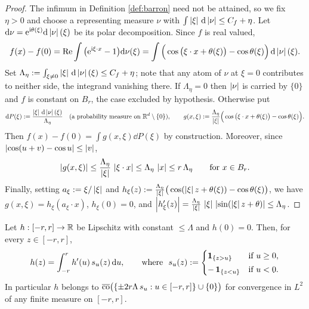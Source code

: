 \documentclass[11pt,a4paper]{article}
\begin{document}
\begin{proof}
The infimum in Definition \ref{def:barron} need not be attained, so we fix $\eta > 0$ and choose a
representing measure $\nu$ with $\int\left\lvert \xi \right\rvert\,\mathrm{d}\left\lvert \nu \right\rvert \le C_f + \eta$. Let
$\mathrm{d}\nu = \mathrm{e}^{\mathrm{i}\theta(\xi)}\mathrm{d}\left\lvert \nu \right\rvert(\xi)$ be its polar decomposition. Since $f$ is real
valued,
\[
f(x) - f(0)
= \operatorname{Re} \int \big(\mathrm{e}^{\mathrm{i} \xi\cdot x} - 1\big)\mathrm{d}\nu(\xi)
= \int \Big( \cos\big(\xi\cdot x + \theta(\xi)\big) - \cos\theta(\xi) \Big)\, \mathrm{d}\left\lvert \nu \right\rvert(\xi) .
\]
Set $\Lambda_\eta := \int_{\xi \ne 0} \left\lvert \xi \right\rvert\, \mathrm{d}\left\lvert \nu \right\rvert(\xi) \le C_f + \eta$; note that any
atom of $\nu$ at $\xi = 0$ contributes to neither side, the integrand vanishing there. If
$\Lambda_\eta = 0$ then $\left\lvert \nu \right\rvert$ is carried by $\{0\}$ and $f$ is constant on $B_r$, the case
excluded by hypothesis. Otherwise put
\[
\mathrm{d} P(\xi) := \frac{\left\lvert \xi \right\rvert\,\mathrm{d}\left\lvert \nu \right\rvert(\xi)}{\Lambda_\eta}
\quad\text{(a probability measure on } \mathbb{R}^d\setminus\{0\}),
\qquad
g(x,\xi) := \frac{\Lambda_\eta}{\left\lvert \xi \right\rvert}\Big( \cos\big(\xi\cdot x + \theta(\xi)\big) - \cos\theta(\xi)\Big).
\]
Then $f(x) - f(0) = \int g(x,\xi)\dd P(\xi)$ by construction. Moreover, since
$\left\lvert \cos(u+v) - \cos u \right\rvert \le \left\lvert v \right\rvert$,
\[
\left\lvert g(x,\xi) \right\rvert \le \frac{\Lambda_\eta}{\left\lvert \xi \right\rvert}\,\left\lvert \xi\cdot x \right\rvert \le \Lambda_\eta\, \left\lvert x \right\rvert \le r\, \Lambda_\eta
\qquad \text{for } x \in B_r .
\]
Finally, setting $a_\xi := \xi/\left\lvert \xi \right\rvert$ and
$h_\xi(z) := \frac{\Lambda_\eta}{\left\lvert \xi \right\rvert}\big(\cos(\left\lvert \xi \right\rvert z + \theta(\xi)) - \cos\theta(\xi)\big)$,
we have $g(x,\xi) = h_\xi(a_\xi\cdot x)$, $h_\xi(0) = 0$, and
$\left\lvert h_\xi'(z) \right\rvert = \frac{\Lambda_\eta}{\left\lvert \xi \right\rvert}\,\left\lvert \xi \right\rvert\, \left\lvert \sin(\left\lvert \xi \right\rvert z + \theta) \right\rvert \le \Lambda_\eta$.
\end{proof}

\begin{lemma}\label{lem:barron-B}
Let $h : [-r,r] \to \mathbb{R}$ be Lipschitz with constant $\le \Lambda$ and $h(0) = 0$. Then, for every
$z \in [-r,r]$,
\[
h(z) = \int_{-r}^{r} h'(u)\, s_u(z)\, \mathrm{d} u,
\qquad \text{where } \
s_u(z) := \begin{cases} \mathbf{1}_{\{z > u\}} & \text{if } u \ge 0,\\[2pt]
-\,\mathbf{1}_{\{z < u\}} & \text{if } u < 0. \end{cases}
\]
In particular $h$ belongs to
$\overline{\operatorname{co}}\big( \{\pm 2r\Lambda\, s_u : u \in [-r,r]\} \cup \{0\}\big)$ for convergence in
$L^2$ of any finite measure on $[-r,r]$.
\end{lemma}
\end{document}
